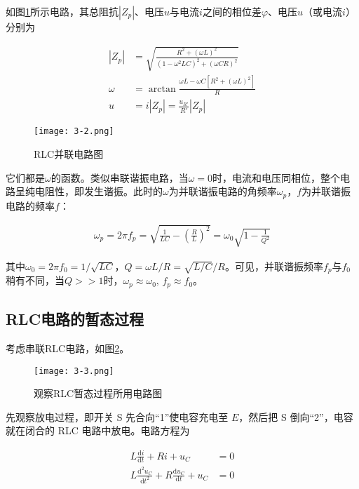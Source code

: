 \documentclass[12pt]{article}
\begin{document}
如图\ref{fig:2}所示电路，其总阻抗$|Z_p|$、电压$u$与电流$i$之间的相位差$\varphi$、电压$u$（或电流$i$）分别为

\[
    \begin{aligned}
        |Z_p|&=\sqrt{\frac{R^2+(\omega L)^2}{(1-\omega^2LC)^2+(\omega CR)^2}} \\
        \omega &=\arctan\frac{\omega L-\omega C[R^2+(\omega L)^2]}{R} \\
        u &=i|Z_p|=\frac{u_{R'}}{R'}|Z_p|
    \end{aligned}
\]

\begin{figure}[htbp]\label{fig:2}
    \centering
    \texttt{[image: 3-2.png]}
    \caption{RLC并联电路图}
\end{figure}

它们都是$\omega$的函数。类似串联谐振电路，当$\omega=0$时，电流和电压同相位，整个电路呈纯电阻性，即发生谐振。此时的$\omega$为并联谐振电路的角频率$\omega_p$，$f$为并联谐振电路的频率$f$：

\[
    \begin{aligned}
        \omega_p=2\pi f_p=\sqrt{\frac{1}{LC}-\left(\frac{R}{L}\right)^2}=\omega_0\sqrt{1-\frac{1}{Q^2}}
    \end{aligned}
\]

其中$\omega_0=2\pi f_0=1/\sqrt{LC}$，$Q=\omega L/R=\sqrt{L/C}/R$。可见，并联谐振频率$f_p$与$f_0$稍有不同，当$Q>>1$时，$\omega_p\approx\omega_0,\,f_p\approx f_0$。

\subsection{RLC电路的暂态过程}

考虑串联RLC电路，如图\ref{fig:3}。

\begin{figure}[htbp]\label{fig:3}
    \centering
    \texttt{[image: 3-3.png]}
    \caption{观察RLC暂态过程所用电路图}
\end{figure}

先观察放电过程，即开关 S 先合向“1”使电容充电至 $E$，然后把 S 倒向“2”，电容就在闭合的 RLC 电路中放电。电路方程为

\[
    \begin{aligned}
        L\frac{\mathrm{d}i}{\mathrm{d}t}+Ri+u_C&=0 \\
        L\frac{\mathrm{d}^2u_C}{\mathrm{d}t^2}+R\frac{\mathrm{d}u_C}{\mathrm{d}t}+u_C&=0
    \end{aligned}
\]
\end{document}
